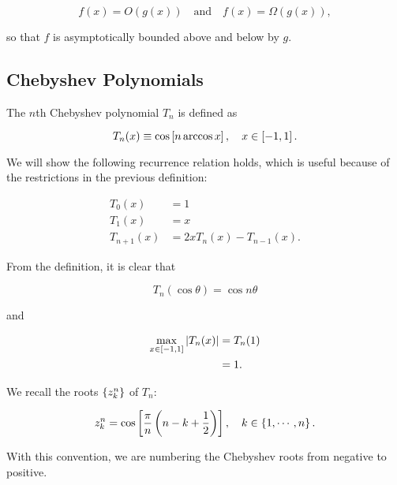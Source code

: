 \begin{equation}
    f(x) = O(g(x)) \quad\text{and}\quad f(x) = \Omega(g(x)),
\end{equation}

\noindent
so that $f$ is asymptotically bounded above and below by $g$.



\subsection{Chebyshev Polynomials}
\label{ssec:kar_cheby}

The $n$th Chebyshev polynomial $T_{n}$ is defined as

\begin{equation}
    T_{n}(x) \equiv \cos\left[ n\arccos x \right],\quad x\in\left[ -1,1 \right].
\end{equation}

\noindent
We will show the following recurrence relation holds, which is
useful because of the restrictions in the previous definition:

\begin{align}
    T_{0}(x) &= 1 \nonumber\\
    T_{1}(x) &= x \nonumber\\
    T_{n+1}(x) &= 2xT_{n}(x) - T_{n-1}(x).
    \label{eq:cheby_rec_rel}
\end{align}

\noindent
From the definition, it is clear that

\begin{equation}
    T_{n}(\cos\theta) = \cos n\theta
    \label{eq:cheby_cosine_property}
\end{equation}

\noindent
and

\begin{align}
    \max_{x\in\left[ -1,1 \right]} \left| T_{n}(x) \right| &= T_{n}(1) \nonumber\\
    & = 1.
\end{align}

\noindent
We recall the roots $\left\{ z_{k}^{n} \right\}$ of $T_{n}$:

\begin{equation}
    z_{k}^{n} = \cos\left[ \frac{\pi}{n}\left( n-k+\frac{1}{2} \right) \right],
        \quad k\in\left\{ 1,\cdots,n \right\}.
\end{equation}

\noindent
With this convention, we are numbering the Chebyshev roots from
negative to positive.


